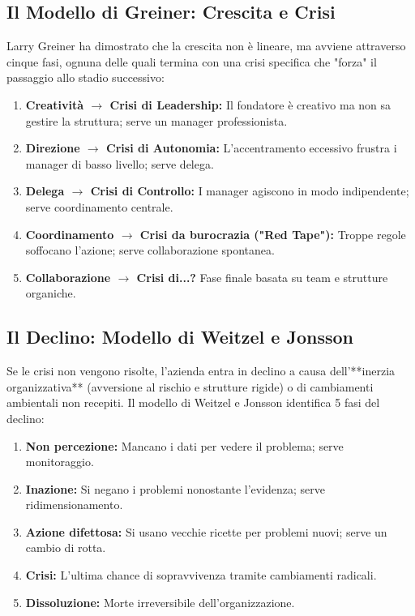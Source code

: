 \documentclass[a4paper,10pt]{article}
\begin{document}
\subsection*{Il Modello di Greiner: Crescita e Crisi}

Larry Greiner ha dimostrato che la crescita non è lineare, ma avviene attraverso cinque fasi, ognuna delle quali termina con una crisi specifica che "forza" il passaggio allo stadio successivo:
\begin{enumerate}
    \item \textbf{Creatività $\rightarrow$ Crisi di Leadership:} Il fondatore è creativo ma non sa gestire la struttura; serve un manager professionista.
    \item \textbf{Direzione $\rightarrow$ Crisi di Autonomia:} L'accentramento eccessivo frustra i manager di basso livello; serve delega.
    \item \textbf{Delega $\rightarrow$ Crisi di Controllo:} I manager agiscono in modo indipendente; serve coordinamento centrale.
    \item \textbf{Coordinamento $\rightarrow$ Crisi da burocrazia ("Red Tape"):} Troppe regole soffocano l'azione; serve collaborazione spontanea.
    \item \textbf{Collaborazione $\rightarrow$ Crisi di...?} Fase finale basata su team e strutture organiche.
\end{enumerate}

\subsection*{Il Declino: Modello di Weitzel e Jonsson}

Se le crisi non vengono risolte, l'azienda entra in declino a causa dell'**inerzia organizzativa** (avversione al rischio e strutture rigide) o di cambiamenti ambientali non recepiti. Il modello di Weitzel e Jonsson identifica 5 fasi del declino:
\begin{enumerate}
    \item \textbf{Non percezione:} Mancano i dati per vedere il problema; serve monitoraggio.
    \item \textbf{Inazione:} Si negano i problemi nonostante l'evidenza; serve ridimensionamento.
    \item \textbf{Azione difettosa:} Si usano vecchie ricette per problemi nuovi; serve un cambio di rotta.
    \item \textbf{Crisi:} L'ultima chance di sopravvivenza tramite cambiamenti radicali.
    \item \textbf{Dissoluzione:} Morte irreversibile dell'organizzazione.
\end{enumerate}
\end{document}
